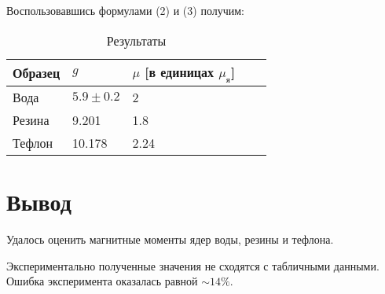 \documentclass[a4paper, 14pt]{article}
\begin{document}
Воспользовавшись формулами (2) и (3) получим:

\begin{table}[hbtp]
    \begin{center}
    
    \begin{tabular}{|l|l|l|l|l|}
    \hline
    Образец & $g$  & $\mu$ [в единицах $\mu_{\text{я}}$]   \\ \hline
    Вода    & $5.9 \pm 0.2$    & 2          \\ \hline
    Резина  & 9.201           & 1.8            \\ \hline
    Тефлон  & 10.178          & 2.24            \\ \hline
    \end{tabular}
    \caption{Результаты}
    \label{table:end}
\end{center}
\end{table}


\section*{\textcolor{header}{Вывод}}

Удалось оценить магнитные моменты ядер воды, резины и тефлона. 

Экспериментально полученные значения не сходятся с табличными данными.
Ошибка эксперимента оказалась равной $\sim 14 \%$. 
\end{document}
